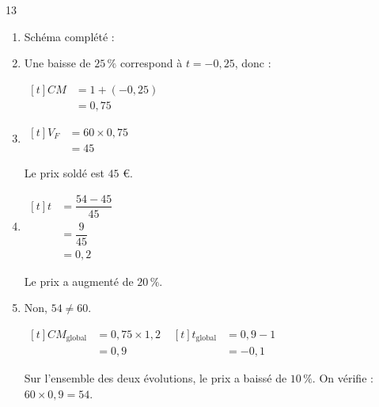 \documentclass[10pt,a4paper]{article}
\begin{document}
\begin{corr}[Guidé]{13}
\begin{enumerate}[leftmargin=*]
    \item Schéma complété :
    \item Une baisse de \(25\,\%\) correspond à \(t=-0,25\), donc :

    \(\begin{aligned}[t] CM&=1+(-0,25)\\ &=0,75\end{aligned}\)
    \item \(\begin{aligned}[t] V_F&=60\times 0,75\\ &=45\end{aligned}\)

    Le prix soldé est \(45\) \euro.
    \item \(\begin{aligned}[t] t&=\dfrac{54-45}{45}\\ &=\dfrac{9}{45}\\ &=0,2\end{aligned}\)

    Le prix a augmenté de \(20\,\%\).
    \item Non, \(54\neq 60\).

    \(\begin{aligned}[t] CM_{\text{global}}&=0,75\times 1,2\\ &=0,9\end{aligned}\) \qquad \(\begin{aligned}[t] t_{\text{global}}&=0,9-1\\ &=-0,1\end{aligned}\)

    Sur l'ensemble des deux évolutions, le prix a baissé de \(10\,\%\). On vérifie : \(60\times 0,9=54\).
\end{enumerate}
\end{corr}
\end{document}

